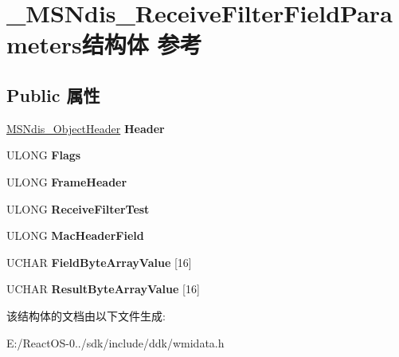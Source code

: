 \hypertarget{struct___m_s_ndis___receive_filter_field_parameters}{}\section{\+\_\+\+M\+S\+Ndis\+\_\+\+Receive\+Filter\+Field\+Parameters结构体 参考}
\label{struct___m_s_ndis___receive_filter_field_parameters}
\subsection*{Public 属性}
\begin{DoxyCompactItemize}
\item 
\mbox{\label{struct___m_s_ndis___receive_filter_field_parameters_ad9c392e96af9a9c95a017d7e8685814c}} 
\hyperlink{struct___m_s_ndis___object_header}{M\+S\+Ndis\+\_\+\+Object\+Header} {\bfseries Header}
\item 
\mbox{\label{struct___m_s_ndis___receive_filter_field_parameters_a82197e7a21ea020c3cd4a5fa1e3b0d47}} 
U\+L\+O\+NG {\bfseries Flags}
\item 
\mbox{\label{struct___m_s_ndis___receive_filter_field_parameters_a78b7b516cc9b28e57b05662e72b0bee6}} 
U\+L\+O\+NG {\bfseries Frame\+Header}
\item 
\mbox{\label{struct___m_s_ndis___receive_filter_field_parameters_a66a24bdef9e917483763794539b34e78}} 
U\+L\+O\+NG {\bfseries Receive\+Filter\+Test}
\item 
\mbox{\label{struct___m_s_ndis___receive_filter_field_parameters_a1e26551f5dfbaff6c142c1bac87fb39d}} 
U\+L\+O\+NG {\bfseries Mac\+Header\+Field}
\item 
\mbox{\label{struct___m_s_ndis___receive_filter_field_parameters_a9d62805749c28cbe939a7e0b60ce0f2a}} 
U\+C\+H\+AR {\bfseries Field\+Byte\+Array\+Value} \mbox{[}16\mbox{]}
\item 
\mbox{\label{struct___m_s_ndis___receive_filter_field_parameters_a37f84cae8cbf85ecd782a7e4e28b6d1e}} 
U\+C\+H\+AR {\bfseries Result\+Byte\+Array\+Value} \mbox{[}16\mbox{]}
\end{DoxyCompactItemize}


该结构体的文档由以下文件生成\+:\begin{DoxyCompactItemize}
\item 
E\+:/\+React\+O\+S-\/0../sdk/include/ddk/wmidata.\+h\end{DoxyCompactItemize}
